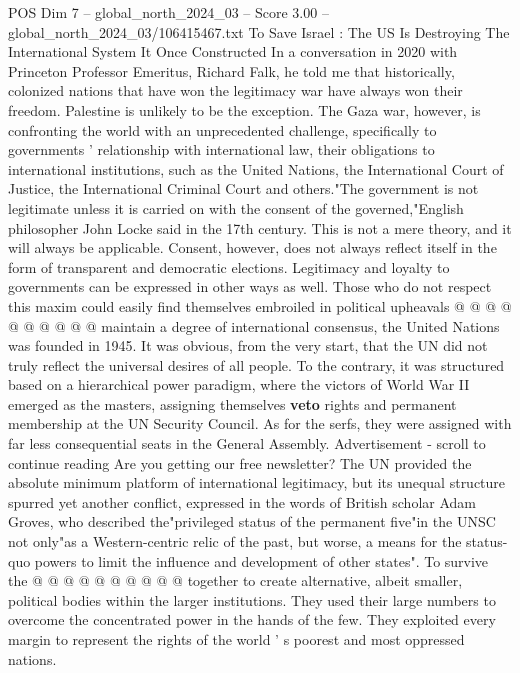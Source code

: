 \begin{textsample}{POS Dim 7 – global\_north\_2024\_03 – Score 3.00 – global\_north\_2024\_03/106415467.txt}  \label{ex:f7_pos_210}
To Save Israel : The US Is Destroying The International System It Once Constructed In a conversation in 2020 with Princeton Professor Emeritus, Richard Falk, he told me that historically, colonized nations that have won the legitimacy war have always won their freedom.
Palestine is unlikely to be the exception.
The Gaza war, however, is confronting the world with an unprecedented challenge, specifically to governments ' relationship with international law, their obligations to international institutions, such as the United Nations, the International Court of Justice, the International Criminal Court and others."The government is not legitimate unless it is carried on with the consent of the governed,"English philosopher John Locke said in the 17th century.
This is not a mere theory, and it will always be applicable.
Consent, however, does not always reflect itself in the form of transparent and democratic elections.
Legitimacy and loyalty to governments can be expressed in other ways as well.
Those who do not respect this maxim could easily find themselves embroiled in political upheavals @ @ @ @ @ @ @ @ @ @ maintain a degree of international consensus, the United Nations was founded in 1945.
It was obvious, from the very start, that the UN did not truly reflect the universal desires of all people.
To the contrary, it was structured based on a hierarchical power paradigm, where the victors of World War II emerged as the masters, assigning themselves \textbf{veto} rights and permanent membership at the UN Security Council.
As for the serfs, they were assigned with far less consequential seats in the General Assembly.
Advertisement - scroll to continue reading Are you getting our free newsletter?
The UN provided the absolute minimum platform of international legitimacy, but its unequal structure spurred yet another conflict, expressed in the words of British scholar Adam Groves, who described the"privileged status of the permanent five"in the UNSC not only"as a Western-centric relic of the past, but worse, a means for the status-quo powers to limit the influence and development of other states".
To survive the @ @ @ @ @ @ @ @ @ @ together to create alternative, albeit smaller, political bodies within the larger institutions.
They used their large numbers to overcome the concentrated power in the hands of the few.
They exploited every margin to represent the rights of the world ' s poorest and most oppressed nations.

\end{textsample}
